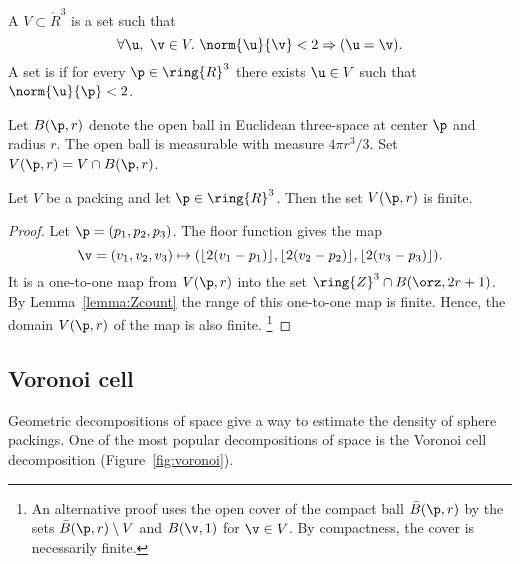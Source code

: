 \figDEQCVQL %

\begin{definition} 
A  $ V\subset \ring{R}^3$ is a set such that
\[ 
\forall  \u,~\v\in  V.~  \norm{ \u}{\v} < 2 \Rightarrow ( \u=\v).
\]  
A set is  if for every $\p\in\ring{R}^3$ there
exists $ \u\in V$ such that $\norm{ \u}{\p}< 2$.
\end{definition}
%
%



Let $B(\p,r)$ denote the open ball in
Euclidean three-space at center $\p$ and radius $r$.  The open ball
is measurable with measure $4\pi r^3/3$.
 Set $ V(\p,r) = V \cap
B(\p,r)$. %
%
%

\begin{lemma}[]
\label{lemma:V-finite}
Let $ V$ be a packing and let $\p\in\ring{R}^3$.
Then the set $ V(\p,r)$ is finite.
\end{lemma}

\begin{proof}  Let $\p = (p_1,p_2,p_3)$. The floor function gives the map
\[ \v=(v_1,v_2,v_3)\mapsto (\lfloor 2(v_1-p_1)
  \rfloor, \lfloor 2(v_2-p_2) \rfloor, \lfloor 2(v_3-p_3) \rfloor).
\] 
It is a one-to-one map from $ V(\p,r)$ into the set $\ring{Z}^3\cap
B(\orz,2r + 1)$.  By Lemma~\ref{lemma:Zcount} the range of this
one-to-one map is finite.  Hence, the domain $ V(\p,r)$ of the map is
also finite.%
\footnote{An alternative proof uses the open cover of the compact ball
  $\bar B(\p,r)$ by the sets $\bar B(\p,r)\setminus V$ and $B(\v,1)$
  for $\v\in V$. By compactness, the cover is necessarily finite.}
\end{proof}
%






\subsection{Voronoi cell}

Geometric decompositions of space give a way to estimate the density
of sphere packings.  One of the most popular decompositions of space
is the Voronoi cell decomposition (Figure~\ref{fig:voronoi}).

